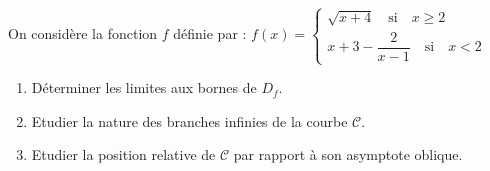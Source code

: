 \begin{exercice}
On considère la fonction $ f $ définie par :
$ f (x)=\left\{\begin{array}{l} \sqrt{x +4}\quad \text{si} \quad x\geq 2 \\ x+3-\dfrac{2}{x-1}\quad \text{si}\quad x< 2  \end{array} \right.$

\begin{enumerate}
\item Déterminer  les limites aux bornes de $ D_{f} $.
\item Etudier la nature des branches infinies de la courbe $ \mathcal{C} $.
\item Etudier la position relative de $ \mathcal{C} $ par rapport à son asymptote oblique.
\end{enumerate}
\end{exercice}
